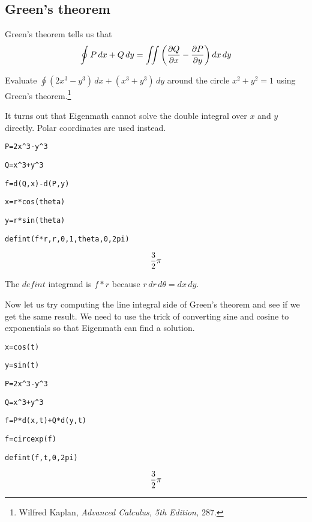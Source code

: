 \subsection{Green's theorem}
Green's theorem tells us that
$$\oint P\,dx+Q\,dy=\int\!\!\!\int
\left({\partial Q\over\partial x}-{\partial P\over\partial y}\right)
dx\,dy$$

\noindent
Evaluate $\oint (2x^3-y^3)\,dx+(x^3+y^3)\,dy$ around the circle
$x^2+y^2=1$ using Green's theorem.\footnote{
Wilfred Kaplan, {\it Advanced Calculus, 5th Edition,} 287.}

\medskip
\noindent
It turns out that Eigenmath cannot solve the double integral over
$x$ and $y$ directly.
Polar coordinates are used instead.

\medskip
\verb$P=2x^3-y^3$

\verb$Q=x^3+y^3$

\verb$f=d(Q,x)-d(P,y)$

\verb$x=r*cos(theta)$

\verb$y=r*sin(theta)$

\verb$defint(f*r,r,0,1,theta,0,2pi)$

$${3\over2}\pi$$

\medskip
\noindent
The $defint$ integrand is $f{*}r$ because $r\,dr\,d\theta=dx\,dy$.

\medskip
\noindent
Now let us try computing the line integral side of Green's theorem
and see if we get the same result.
We need to use the trick of converting sine and cosine to exponentials
so that Eigenmath can find a solution.

\medskip
\verb$x=cos(t)$

\verb$y=sin(t)$

\verb$P=2x^3-y^3$

\verb$Q=x^3+y^3$

\verb$f=P*d(x,t)+Q*d(y,t)$

\verb$f=circexp(f)$

\verb$defint(f,t,0,2pi)$

$${3\over2}\pi$$

